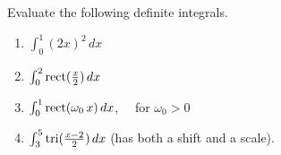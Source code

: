 \begin{example} Evaluate the following definite integrals.
\begin{enumerate}
\renewcommand{\labelenumi}{(\alph{enumi})}
\setlength{\itemsep}{.2cm}
    \item $\int_0^1 (2x)^2 \, dx$

     \item $\int_0^2 \mathrm{rect}(\frac{x}{2})\, dx$

      \item $\int_0^1 \mathrm{rect}(\omega_0\, x)\, dx$, ~~for $\omega_0>0$

     \item $\int_3^5 \mathrm{tri}(\frac{x-2}{2})\, dx$ (has both a shift and a scale).
\end{enumerate}
    
\end{example}

\solution 

